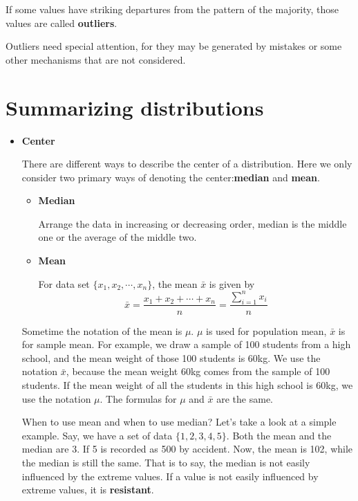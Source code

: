 \documentclass[a4paper, 12pt,twoside]{book}
\begin{document}
\begin{itemize}
If some values have striking departures from the pattern of the majority, those values are called \textbf{outliers}.
 
\colorbox{babypink}{\parbox{15.2cm}{Outliers need special attention, for they may be generated by mistakes or some other mechanisms that are not considered.}}
\end{itemize}
\section{Summarizing distributions}
\begin{itemize}
\item \textbf{Center}

There are different ways to describe the center of a distribution. Here we only consider two primary ways of denoting the center:\textbf{median} and \textbf{mean}.

\begin{itemize}
 \item \textbf{Median}
 
 Arrange the data in increasing or decreasing order, median is the middle one or the average of the middle two. 
 
 \item \textbf{Mean}
 
 For data set $\{x_1, x_2, \cdots, x_n\}$, the mean $\bar{x}$ is given by 
 $$\bar{x} = \frac{x_1+x_2+\cdots+x_n}{n}
           = \frac{\sum_{i=1}^{n}x_i}{n} $$
\end{itemize}

\colorbox{babypink}{Sometime the notation of the mean is $\mu$.} $\mu$ is used for population mean, $\bar{x}$ is for sample mean. For example, we draw a sample of 100 students from a high school, and the mean weight of those 100 students is 60kg. We use  the notation $\bar{x}$, because the mean weight 60kg comes from the sample of 100 students. If the mean weight of all the students in this high school is 60kg, we use the notation $\mu$. The formulas for $\mu$ and $\bar{x}$  are the same.

\colorbox{babypink}{When to use mean and when to use median? }Let's take a look at a simple example. Say, we have a set of data $\{1, 2, 3, 4, 5\}$. Both the mean and the median are 3. If 5 is recorded as 500 by accident. Now, the mean is 102, while the median is still the same. That is to say, the median is not easily influenced by the extreme values. If a value is not easily influenced by extreme values, it is \textbf{resistant}.


\end{itemize}
\end{document}
